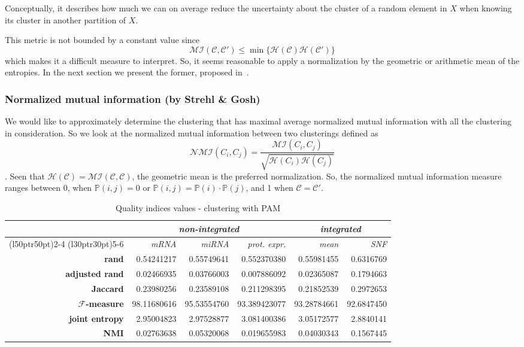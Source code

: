 Conceptually, it describes how much we can on average reduce the uncertainty about the cluster of a random element in $X$ when knowing its cluster in another partition of $X$.

This metric is not bounded by a constant value since
\begin{equation*}
    \mathcal{MI}(\mathcal{C},\mathcal{C}')\leq\min\{\mathcal{H}(\mathcal{C})\mathcal{H}(\mathcal{C}')\}
\end{equation*}
which makes it a difficult measure to interpret. So, it seems reasonable to apply a normalization by the geometric or arithmetic mean of the entropies. In the next section we present the former, proposed in~\cite{StrehlA2003Ce-A}.

\subsubsection{Normalized mutual information (by Strehl \& Gosh)}
We would like to approximately determine the clustering that has maximal average normalized mutual information with all the clustering in consideration. So we look at the normalized mutual information between two clusterings defined as
\begin{equation*}
    \mathcal{NMI}(C_i, C_j) = \frac{\mathcal{MI}(C_i, C_j)}{\sqrt{\mathcal{H}(C_i) \mathcal{H}(C_j)}}
\end{equation*}.
Seen that $\mathcal{H}(\mathcal{C})=\mathcal{MI}(\mathcal{C},\mathcal{C})$, the geometric mean is the preferred normalization. So, the normalized mutual information measure ranges between 0, when $\mathbb{P}(i,j)=0$ or $\mathbb{P}(i,j)=\mathbb{P}(i)\cdot\mathbb{P}(j)$, and 1 when $\mathcal{C}=\mathcal{C}'$.

\begin{table}
    \centering
    \begin{tabularx}{\linewidth}{rrrrrr}
         & \multicolumn{3}{c}{\textit{non-integrated}} & \multicolumn{2}{c}{\textit{integrated}} \\
        \cmidrule(l{50pt}r{50pt}){2-4} 
        \cmidrule(l{30pt}r{30pt}){5-6}
         & \textit{mRNA} & \textit{miRNA} & \textit{prot. expr.} & \textit{mean} & \textit{SNF}\\
        \midrule
        \textbf{rand} & 0.54241217 & 0.55749641 & 0.552370380 & 0.55981455 & 0.6316769\\
        \textbf{adjusted rand} & 0.02466935 & 0.03766003 & 0.007886092 & 0.02365087 & 0.1794663\\
        \textbf{Jaccard} & 0.23980256 & 0.23589108 & 0.211298395 & 0.21852539 & 0.2972653\\
        \textbf{$\mathcal{F}$-measure} & 98.11680616 & 95.53554760 & 93.389423077 & 93.28784661 & 92.6847450\\
        \textbf{joint entropy} & 2.95004823 & 2.97528877 & 3.081400386 & 3.05172577 & 2.8840141\\
        \textbf{NMI} & 0.02763638 & 0.05320068 & 0.019655983 & 0.04030343 & 0.1567445\\
        \bottomrule		
    \end{tabularx}
    \caption{Quality indices values - clustering with PAM}\label{tab:indices_PAM}
\end{table}

